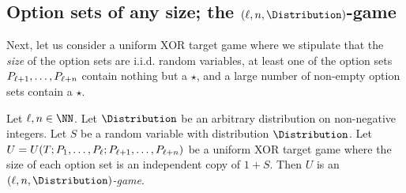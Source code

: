 









\subsection{Option sets of any size\texorpdfstring{; the $(\ell, n, \Distribution)$-game}{}}
    Next, let us consider a uniform XOR target game where we stipulate that 
    the \emph{size} of the option sets are i.i.d. random variables, 
    at least one of the option sets $P_{\ell+1}, \ldots, P_{\ell+n}$ contain nothing but a $\star$, 
    and a large number of non-empty option sets contain a $\star$. 

    \begin{definition}
        \label{def:adaptive-game}
        Let $\ell, n\in \NN$. 
        Let $\Distribution$ be an arbitrary distribution on non-negative integers. 
        Let $S$ be a random variable with distribution $\Distribution$.
        Let $U = U(T; P_1, \ldots, P_\ell; P_{\ell+1}, \ldots, P_{\ell+n} )$ be a uniform XOR target game where 
        the size of each option set is an independent copy of $1 + S$. 
        Then $U$ is an \emph{$(\ell, n, \Distribution)$-game}.
    \end{definition}

